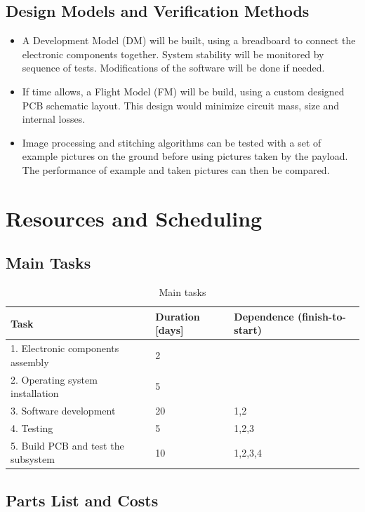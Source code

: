 \documentclass[fontsize=11pt,paper=a4,]{scrartcl}
\begin{document}
\subsection{Design Models and Verification Methods}
\begin{itemize}
\item A Development Model (DM) will be built, using a breadboard to connect the electronic components together. System stability will be monitored by sequence of tests. Modifications of the software will be done if needed.
\item If time allows, a Flight Model (FM) will be build, using a custom designed PCB schematic layout. This design would minimize circuit mass, size and internal losses.
\item {\color{red} Image processing and stitching algorithms can be tested with a set of example pictures on the ground before using pictures taken by the payload. The performance of example and taken pictures can then be compared.}
\end{itemize}


\section{Resources and Scheduling}
\subsection{Main Tasks}
\begin{table}[htbp!]
\centering
\caption{Main tasks}
\label{tab:main_tasks}
\begin{tabular}{| l | l | l |} \hline
Task & Duration [days] & Dependence (finish-to-start) \\ \hline
1. Electronic components assembly & 2 & \\ \hline
2. Operating system installation & 5 & \\ \hline
3. Software development & 20 & 1,2 \\ \hline
4. Testing & 5 & 1,2,3 \\ \hline
5. Build PCB and test the subsystem & 10 & 1,2,3,4 \\ \hline
\end{tabular}
\vspace{-1.0em}
\end{table}


\subsection{Parts List and Costs}
\end{document}
